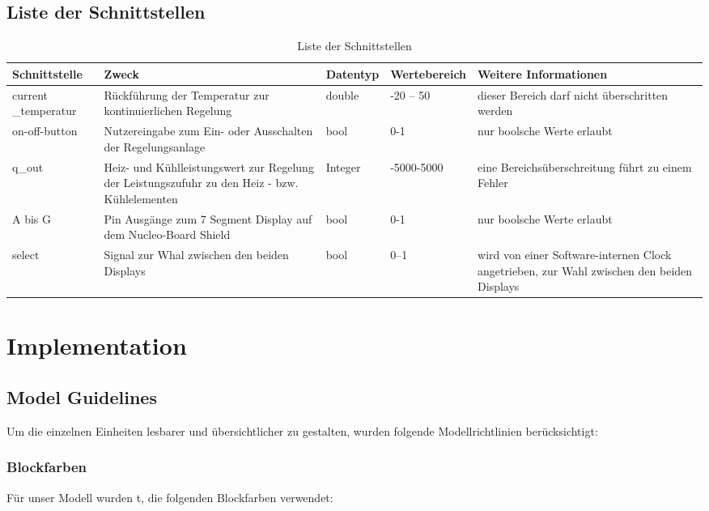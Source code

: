 \documentclass[a4paper,12pt]{article}
\begin{document}
	\subsection{Liste der Schnittstellen}
	\begin{table}[h!]
		\centering
		\renewcommand{\arraystretch}{1.5} %
		\begin{tabular}{@{} p{3cm} p{4cm} p{3cm} p{3cm} p{4cm} @{}}
			\toprule
			\textbf{Schnittstelle} & \textbf{Zweck} & \textbf{Datentyp} & \textbf{Wertebereich} & \textbf{Weitere Informationen} \\
			\midrule
			current \_temperatur & Rückführung der Temperatur zur kontinuierlichen Regelung & double & -20 -- 50 & dieser Bereich darf nicht überschritten werden \\
			on-off-button & Nutzereingabe zum Ein- oder Ausschalten der Regelungsanlage & bool & 0-1 & nur boolsche Werte erlaubt \\
			q\_out & Heiz- und Kühlleistungswert zur Regelung der Leistungszufuhr zu den Heiz - bzw. Kühlelementen & Integer & -5000-5000 & eine Bereichsüberschreitung führt zu einem Fehler \\
			A bis G & Pin Ausgänge zum 7 Segment Display auf dem Nucleo-Board Shield & bool & 0-1 & nur boolsche Werte erlaubt \\
			select & Signal zur Whal zwischen den beiden Displays & bool & 0–1 & wird von einer Software-internen Clock angetrieben, zur Wahl zwischen den beiden Displays \\
			\bottomrule
		\end{tabular}
		\caption{Liste der Schnittstellen}
		\label{tab:schnittstellen}
	\end{table}
	
	\newpage
	
	\section{Implementation}
	\subsection{Model Guidelines}
	Um die einzelnen Einheiten lesbarer und übersichtlicher zu gestalten, wurden folgende Modellrichtlinien berücksichtigt:
	
	\subsubsection{Blockfarben}
	Für unser Modell wurden t, die folgenden Blockfarben verwendet:
	
\end{document}
